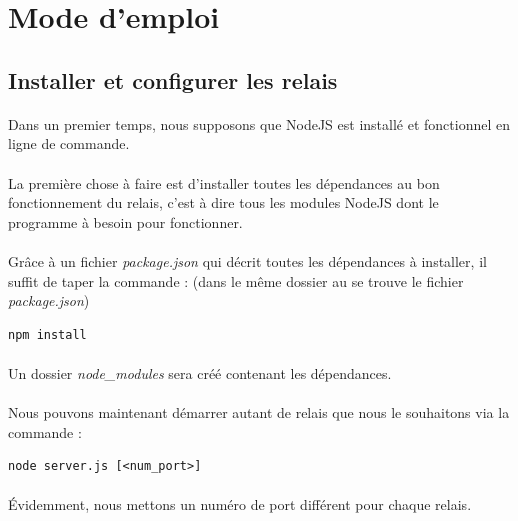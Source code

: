 \documentclass[a4paper,12pt]{report}
\begin{document}
\newpage	
\section{Mode d'emploi}
	\subsection{Installer et configurer les relais}
	\paragraph*{}
	Dans un premier temps, nous supposons que NodeJS est installé et fonctionnel en ligne de commande.
	\paragraph*{}
	La première chose à faire est d'installer toutes les dépendances au bon fonctionnement du relais, c'est à dire tous les modules NodeJS dont le programme à besoin pour fonctionner.
	\paragraph*{}
	Grâce à un fichier \emph{package.json} qui décrit toutes les dépendances à installer, il suffit de taper la commande : (dans le même dossier au se trouve le fichier \emph{package.json})
	
	\begin{lstlisting}
npm install
	\end{lstlisting}
	
	\paragraph*{}
	Un dossier \emph{node\_modules} sera créé contenant les dépendances.
	
	\paragraph*{}
	Nous pouvons maintenant démarrer autant de relais que nous le souhaitons via la commande :
	
	\begin{lstlisting}
node server.js [<num_port>]
	\end{lstlisting}	
	
	\paragraph*{}
	Évidemment, nous mettons un numéro de port différent pour chaque relais.
	
\end{document}
